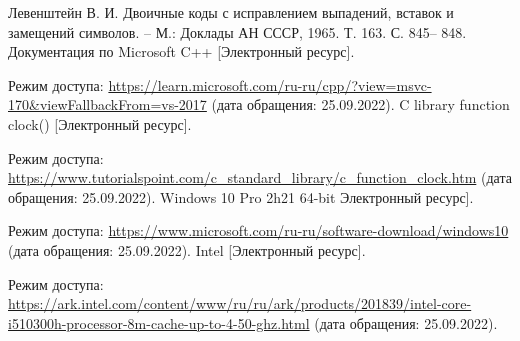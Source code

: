 \renewcommand\bibname{Список литературы} %

\begin{thebibliography}{5}
	Левенштейн В. И. Двоичные коды с исправлением выпадений, вставок и замещений символов. – М.: Доклады АН СССР, 1965. Т. 163. С. 845– 848.
	Документация по Microsoft C++ [Электронный ресурс]. 
	
	Режим доступа: \url{https://learn.microsoft.com/ru-ru/cpp/?view=msvc-170&viewFallbackFrom=vs-2017} (дата обращения: 25.09.2022).
	C library function clock() [Электронный ресурс]. 
	
	Режим доступа: \url{https://www.tutorialspoint.com/c_standard_library/c_function_clock.htm} (дата обращения: 25.09.2022).
	Windows 10 Pro 2h21 64-bit  Электронный ресурс]. 
	
	Режим доступа: \url{https://www.microsoft.com/ru-ru/software-download/windows10} (дата обращения: 25.09.2022).
	Intel [Электронный ресурс]. 
	
	Режим доступа: \url{https://ark.intel.com/content/www/ru/ru/ark/products/201839/intel-core-i510300h-processor-8m-cache-up-to-4-50-ghz.html} (дата обращения: 25.09.2022).
\end{thebibliography}